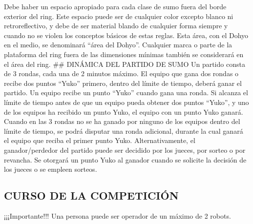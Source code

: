 \documentclass[
  letterpaper,
  DIV=11,
  numbers=noendperiod]{scrreprt}
\begin{document}
Debe haber un espacio apropiado para cada clase de sumo fuera del borde
exterior del ring. Este espacio puede ser de cualquier color excepto
blanco ni retroreflectivo, y debe de ser material blando de cualquier
forma siempre y cuando no se violen los conceptos básicos de estas
reglas. Esta área, con el Dohyo en el medio, se denominará ``área del
Dohyo''. Cualquier marca o parte de la plataforma del ring fuera de las
dimensiones mínimas también se considerará en el área del ring. \#\#
DINÁMICA DEL PARTIDO DE SUMO Un partido consta de 3 rondas, cada una de
2 minutos máximo. El equipo que gana dos rondas o recibe dos puntos
``Yuko'' primero, dentro del límite de tiempo, deberá ganar el partido.
Un equipo recibe un punto ``Yuko'' cuando gana una ronda. Si alcanza el
límite de tiempo antes de que un equipo pueda obtener dos puntos
``Yuko'', y uno de los equipos ha recibido un punto Yuko, el equipo con
un punto Yuko ganará. Cuando en las 3 rondas no se ha ganado por ninguno
de los equipos dentro del límite de tiempo, se podrá disputar una ronda
adicional, durante la cual ganará el equipo que reciba el primer punto
Yuko. Alternativamente, el ganador/perdedor del partido puede ser
decidido por los jueces, por sorteo o por revancha. Se otorgará un punto
Yuko al ganador cuando se solicite la decisión de los jueces o se
empleen sorteos.

\subsection{CURSO DE LA COMPETICIÓN}\label{curso-de-la-competiciuxf3n}

¡¡¡Importante!!! Una persona puede ser operador de un máximo de 2
robots.
\end{document}
